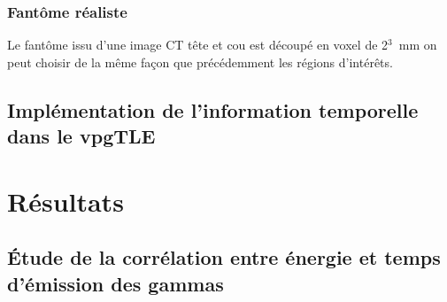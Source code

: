 \documentclass[11pt,a4paper,oldfontcommands]{memoir}
\begin{document}
\subsubsection{Fantôme réaliste}

Le fantôme issu d'une image CT tête et cou est découpé en voxel de 2$^3$~mm on peut choisir de la même façon que précédemment les régions d’intérêts.

\subsection{Implémentation de l'information temporelle dans le vpgTLE}


\section{Résultats}

\subsection{\'Etude de la corrélation entre énergie et temps d'émission des gammas}
\end{document}
